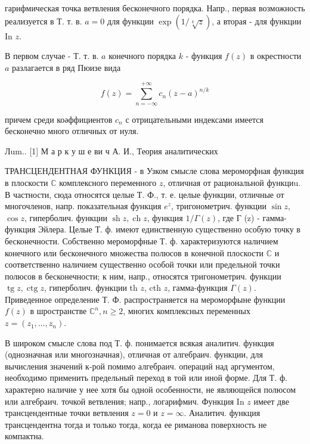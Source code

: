 \documentclass[10pt]{article}
\begin{document}
гарифмическая точка ветвления бесконечного порядка. Напр., первая возможность реализуется в Т. т. в. $a=0$ для функции $\exp (1 / \sqrt[k]{z})$, а вторая - для функции In $z$.



В первом случае - Т. т. в. $a$ конечного порядка $k$ - функция $f(z)$ в окрестности $a$ разлагается в ряд Пюизе вида



\[

f(z)=\sum_{n=-\infty}^{+\infty} c_{n}(z-a)^{n / k}

\]



причем среди коәффициентов $c_{n}$ с отрицательными индексами имеется бесконечно много отличных от нуля.



Лum.. [1] М а р к у ш е ви ч А. И., Теория аналитических



ТРАНСЦЕНДЕНТНАЯ ФУНКЦИЯ - в Узком смысле слова мероморфная функция в плоскости $\mathbb{C}$ комплексного переменного $z$, отличная от рациональной функциu. В частности, сюда относятся целые Т. Ф., т. е. целые функции, отличные от многочленов, напр. показательная функция $e^{z}$, тригонометрич. функции $\sin z$, $\cos z$, гиперболич. функции $\operatorname{sh} z, \operatorname{ch} z$, функция $1 / \Gamma(z)$, где Г (z) - гамма-функция Эйлера. Целые Т. ф. имеют единственную существенно особую точку в бесконечности. Собственно мероморфные Т. ф. характеризуются наличием конечного или бесконечного множества полюсов в конечной плоскости $\mathbb{C}$ и соответственно наличием существенно особой точки или предельной точки полюсов в бесконечности; к ним, напр., относятся тригонометрич. функции $\operatorname{tg} z, \operatorname{ctg} z$, гиперболич. функции th $z$, cth $z$, гамма-функция $\Gamma(z)$. Приведенное определение Т. Ф. распространяется на мероморфыне функции $f(z)$ в шространстве $\mathbb{C}^{n}, n \geqslant 2$, многих комплексных переменных $z=\left(z_{1}, \ldots, z_{n}\right)$.



В широком смысле слова под Т. ф. понимается всякая аналитич. функция (однозначная или многозначная), отличная от алгебраич. функции, для вычисления значений к-рой помимо алгебраич. операций над аргументом, необходимо применить предельный переход в той или иной форме. Для Т. ф. характерно наличие у нее хотя бы одной особенности, не являющейся полюсом или алгебраич. точкой ветвления; напр., логарифмич. Функция In $z$ имеет две трансцендентные точки ветвления $z=0$ и $z=\infty$. Аналитич. функция трансцендентна тогда и только тогда, когда ее риманова поверхность не компактна.
\end{document}
